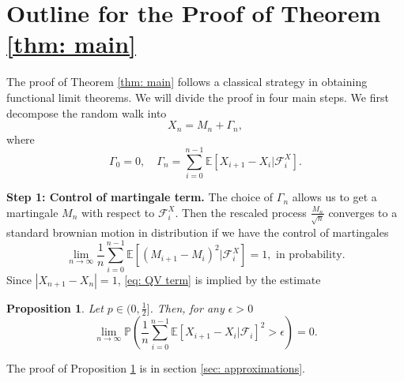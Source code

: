 \documentclass[twoside,12pt,a4paper]{article}
\newtheorem{proposition}{Proposition}[section]
\numberwithin{equation}{section}
\newcommand{\abs}[1]{\left\vert #1 \right\vert}
\begin{document}
	\section{Outline for the Proof of Theorem \ref{thm: main}}\label{sec: proof of main}
	The proof of Theorem \ref{thm: main} follows a classical strategy in obtaining functional limit theorems. We will divide the proof in four main steps. We first decompose the random walk into
	$$X_n = M_n+ \Gamma_n, $$ where
	$$ 
	\Gamma_0 = 0, \quad \Gamma_n = \sum_{i=0}^{n-1} \mathbb{E}\left[ X_{i+1}-X_i | \mathcal{F}_i^X \right].
	$$ 
	
	\textbf{Step 1: Control of martingale term.}
	The choice of $\Gamma_n$ allows us to get a martingale $M_n$ with respect to $\mathcal{F}_i^X.$ Then the rescaled process $\frac{M_n}{\sqrt{n}}$ converges to a standard brownian motion in distribution if we have the control of martingales 
	\begin{equation}\label{eq: QV term}
		\lim_{n\to \infty}\frac{1}{n} \sum_{i=0}^{n-1}\mathbb{E}\left[ (M_{i+1}- M_{i})^2 |\mathcal{F}_i^X \right] =1,  \mbox{ in probability}.
	\end{equation}
	Since $\abs{X_{n+1}-X_n}=1$,  \eqref{eq: QV term} is implied by the estimate
	\begin{proposition} \label{lm: control of martingale} Let $p\in (0,\frac{1}{2}]$. Then, for any $\epsilon >0$
		\begin{equation}\label{eq:  term}
			\lim_{n \to \infty }\mathbb{P}\left(\frac{1}{n} \sum_{i = 0}^{n-1} \mathbb{E}\left[ X_{i+1} - X_i | \mathcal{F}_i \right]^2 > \epsilon \right) =0. 
		\end{equation}
	\end{proposition}
	The proof of Proposition \ref{lm: control of martingale} is in section \ref{sec: approximations}.
	
\end{document}
